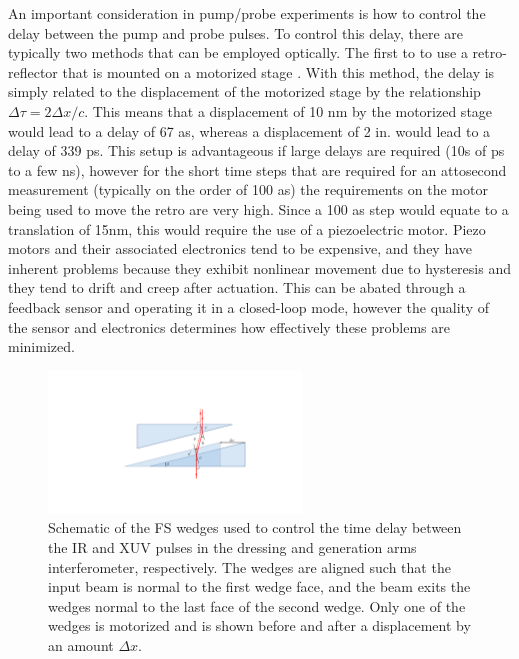 An important consideration in pump/probe experiments is how to control the delay between the pump and probe pulses.  To control this delay, there are typically two methods that can be employed optically.  The first to to use a retro-reflector that is mounted on a motorized stage \cite{jagerAttosecondTransientAbsorption2018, jagerAttosecondTransientAbsorption2017, bellTransientAbsorptionSpectroscopy2013, jiangChargeCarrierDynamics2015, borjaElectronDynamicsSolids2016, chengAttoseondTransientAbsorption2015}.  With this method, the delay is simply related to the displacement of the motorized stage by the relationship $\Delta\tau = 2\Delta x/c$.  This means that a displacement of 10 nm by the motorized stage would lead to a delay of 67 as, whereas a displacement of 2 in. would lead to a delay of 339 ps. This setup is advantageous if large delays are required (10s of ps to a few ns), however for the short time steps that are required for an attosecond measurement (typically on the order of 100 as) the requirements on the motor being used to move the retro are very high.  Since a 100 as step would equate to a translation of 15nm, this would require the use of a piezoelectric motor.  Piezo motors and their associated electronics tend to be expensive, and they have inherent problems because they exhibit nonlinear movement due to hysteresis and they tend to drift and creep after actuation.  This can be abated through a feedback sensor and operating it in a closed-loop mode, however the quality of the sensor and electronics determines how effectively these problems are minimized.

\begin{figure}
	\centering
	\includegraphics[width=0.6\textwidth]{figures/Beamline/wedge_delay_calibration.pdf}
	\caption[Schematic of FS wedges used for delay control]{Schematic of the FS wedges used to control the time delay between the IR and XUV pulses in the dressing and generation arms interferometer, respectively. The wedges are aligned such that the input beam is normal to the first wedge face, and the beam exits the wedges normal to the last face of the second wedge.  Only one of the wedges is motorized and is shown before and after a displacement by an amount $\Delta x$.}
	\label{fig:wedges}
\end{figure}

